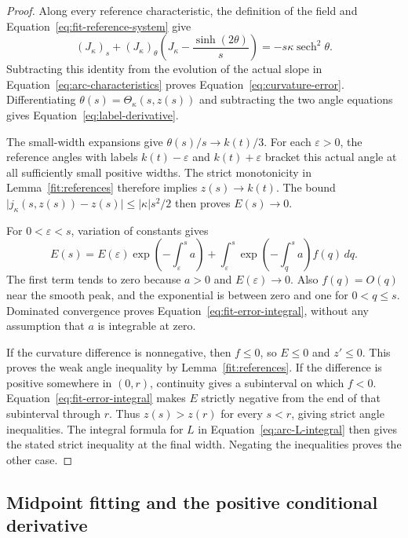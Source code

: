 \begin{proof}
Along every reference characteristic, the definition of the field and
Equation~\eqref{eq:fit-reference-system} give
\[
 (J_\kappa)_s+(J_\kappa)_\theta
       \left(J_\kappa-\frac{\sinh(2\theta)}s\right)
   =-s\kappa\operatorname{sech}^2\theta.
\]
Subtracting this identity from the evolution of the actual slope in
Equation~\eqref{eq:arc-characteristics} proves
Equation~\eqref{eq:curvature-error}.  Differentiating
\(\theta(s)=\Theta_\kappa(s,z(s))\) and subtracting the two angle
equations gives Equation~\eqref{eq:label-derivative}.

The small-width expansions give \(\theta(s)/s\to k(t)/3\).
For each \(\varepsilon>0\), the reference angles with labels
\(k(t)-\varepsilon\) and \(k(t)+\varepsilon\) bracket this actual
angle at all sufficiently small positive widths.  The strict
monotonicity in Lemma~\ref{fit:references} therefore implies
\(z(s)\to k(t)\).  The bound
\(\lvert j_\kappa(s,z(s))-z(s)\rvert\le |\kappa|s^2/2\) then proves
\(E(s)\to0\).

For \(0<\varepsilon<s\), variation of constants gives
\[
 E(s)=E(\varepsilon)
       \exp\left(-\int_\varepsilon^s a\right)
      +\int_\varepsilon^s
       \exp\left(-\int_q^s a\right)f(q)\,dq.
\]
The first term tends to zero because \(a>0\) and
\(E(\varepsilon)\to0\).  Also \(f(q)=O(q)\) near the smooth peak,
and the exponential is between zero and one for \(0<q\le s\).
Dominated convergence proves Equation~\eqref{eq:fit-error-integral},
without any assumption that \(a\) is integrable at zero.

If the curvature difference is nonnegative, then \(f\le0\), so
\(E\le0\) and \(z'\le0\).  This proves the weak angle inequality
by Lemma~\ref{fit:references}.  If the difference is positive
somewhere in \((0,r)\), continuity gives a subinterval on which
\(f<0\).  Equation~\eqref{eq:fit-error-integral} makes \(E\) strictly
negative from the end of that subinterval through \(r\).  Thus
\(z(s)>z(r)\) for every \(s<r\), giving strict angle inequalities.
The integral formula for \(L\) in Equation~\eqref{eq:arc-L-integral}
then gives the stated strict inequality at the final width.
Negating the inequalities proves the other case.
\end{proof}

\subsection{Midpoint fitting and the positive conditional derivative}


